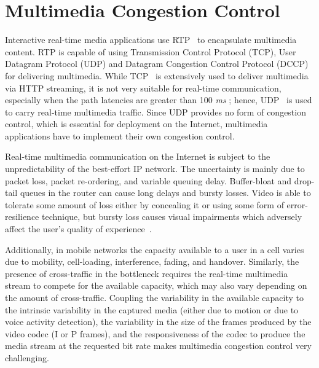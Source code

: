 


\section{Multimedia Congestion Control}

Interactive real-time media applications use RTP~\cite{rfc3550} to encapsulate
multimedia content. RTP is capable of using Transmission Control Protocol (TCP),
User Datagram Protocol (UDP) and Datagram Congestion Control Protocol (DCCP) for delivering
multimedia.  While TCP~\cite{rfc0793} is extensively used to deliver multimedia via
HTTP streaming, it is not very suitable for real-time communication,
especially when the path latencies are greater than 100 \emph{ms} \cite{Brosh:tcp-real-time};
hence, UDP~\cite{rfc0768} is used to carry real-time multimedia traffic. Since
UDP provides no form of congestion control, which is essential for deployment
on the Internet, multimedia applications have to implement their own congestion control.

Real-time multimedia communication on the Internet is subject to the
unpredictability of the best-effort IP network. The uncertainty is mainly due
to packet loss, packet re-ordering, and variable queuing delay.  Buffer-bloat
\cite{gettys:bufferbloat} and drop-tail queues in the router  can cause long
delays and bursty losses. Video is able to tolerate some amount of loss
either by concealing it or using some form of error-resilience technique, but
bursty loss causes visual impairments which adversely affect the user's
quality of experience~\cite{Zink03subjectiveimpression}.

Additionally, in mobile networks  the capacity available to a user in a cell
varies due to mobility, cell-loading, interference, fading, and handover.
Similarly, the presence of cross-traffic in the bottleneck requires the real-time
multimedia stream to compete for the available capacity, which may also
vary depending on the amount of cross-traffic.  Coupling the variability in
the available capacity to  the intrinsic variability in the captured media
(either due to motion or due  to voice activity detection), the variability in the
size of the frames produced  by the video codec (I or P frames), and the
responsiveness of the codec to produce the media stream at the requested bit
rate makes multimedia congestion control very challenging.

